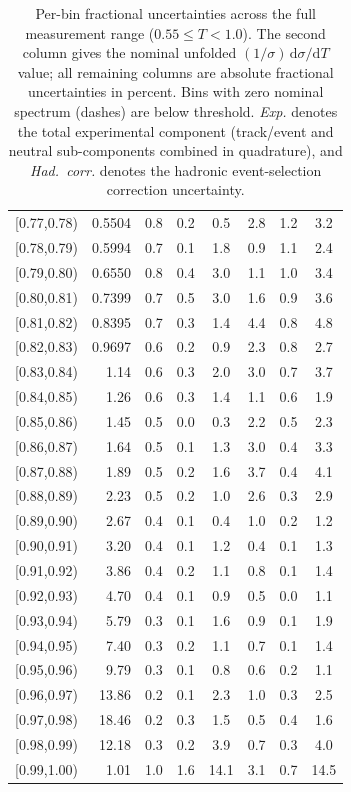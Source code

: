 \begin{table}[t!]
\begin{tabular}{c r c c c c c c}
{[0.77,0.78)} & 0.5504 & 0.8 & 0.2 & 0.5 & 2.8 & 1.2 & 3.2 \\
{[0.78,0.79)} & 0.5994 & 0.7 & 0.1 & 1.8 & 0.9 & 1.1 & 2.4 \\
{[0.79,0.80)} & 0.6550 & 0.8 & 0.4 & 3.0 & 1.1 & 1.0 & 3.4 \\
{[0.80,0.81)} & 0.7399 & 0.7 & 0.5 & 3.0 & 1.6 & 0.9 & 3.6 \\
{[0.81,0.82)} & 0.8395 & 0.7 & 0.3 & 1.4 & 4.4 & 0.8 & 4.8 \\
{[0.82,0.83)} & 0.9697 & 0.6 & 0.2 & 0.9 & 2.3 & 0.8 & 2.7 \\
{[0.83,0.84)} & 1.14 & 0.6 & 0.3 & 2.0 & 3.0 & 0.7 & 3.7 \\
{[0.84,0.85)} & 1.26 & 0.6 & 0.3 & 1.4 & 1.1 & 0.6 & 1.9 \\
{[0.85,0.86)} & 1.45 & 0.5 & 0.0 & 0.3 & 2.2 & 0.5 & 2.3 \\
{[0.86,0.87)} & 1.64 & 0.5 & 0.1 & 1.3 & 3.0 & 0.4 & 3.3 \\
{[0.87,0.88)} & 1.89 & 0.5 & 0.2 & 1.6 & 3.7 & 0.4 & 4.1 \\
{[0.88,0.89)} & 2.23 & 0.5 & 0.2 & 1.0 & 2.6 & 0.3 & 2.9 \\
{[0.89,0.90)} & 2.67 & 0.4 & 0.1 & 0.4 & 1.0 & 0.2 & 1.2 \\
{[0.90,0.91)} & 3.20 & 0.4 & 0.1 & 1.2 & 0.4 & 0.1 & 1.3 \\
{[0.91,0.92)} & 3.86 & 0.4 & 0.2 & 1.1 & 0.8 & 0.1 & 1.4 \\
{[0.92,0.93)} & 4.70 & 0.4 & 0.1 & 0.9 & 0.5 & 0.0 & 1.1 \\
{[0.93,0.94)} & 5.79 & 0.3 & 0.1 & 1.6 & 0.9 & 0.1 & 1.9 \\
{[0.94,0.95)} & 7.40 & 0.3 & 0.2 & 1.1 & 0.7 & 0.1 & 1.4 \\
{[0.95,0.96)} & 9.79 & 0.3 & 0.1 & 0.8 & 0.6 & 0.2 & 1.1 \\
{[0.96,0.97)} & 13.86 & 0.2 & 0.1 & 2.3 & 1.0 & 0.3 & 2.5 \\
{[0.97,0.98)} & 18.46 & 0.2 & 0.3 & 1.5 & 0.5 & 0.4 & 1.6 \\
{[0.98,0.99)} & 12.18 & 0.3 & 0.2 & 3.9 & 0.7 & 0.3 & 4.0 \\
{[0.99,1.00)} & 1.01 & 1.0 & 1.6 & 14.1 & 3.1 & 0.7 & 14.5 \\
\hline
\end{tabular}
\normalsize
\caption{Per-bin fractional uncertainties across the full measurement range ($0.55 \leq T < 1.0$). The second column gives the nominal unfolded $(1/\sigma)\,\mathrm{d}\sigma/\mathrm{d}T$ value; all remaining columns are absolute fractional uncertainties in percent. Bins with zero nominal spectrum (dashes) are below threshold. \textit{Exp.} denotes the total experimental component (track/event and neutral sub-components combined in quadrature), and \textit{Had.\ corr.} denotes the hadronic event-selection correction uncertainty.}
\label{tab:per_bin_uncertainty}
\end{table}